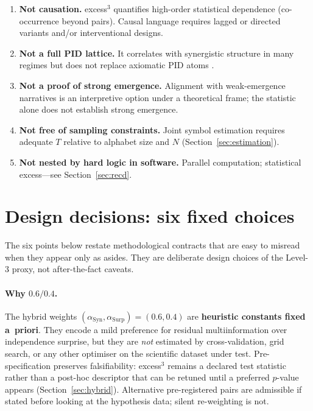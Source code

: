 \documentclass[11pt,a4paper]{article}
\begin{document}
\begin{enumerate}[leftmargin=*,itemsep=3pt]
  \item \textbf{Not causation.}
  excess$^3$ quantifies high-order statistical dependence
  (co-occurrence beyond pairs). Causal language requires lagged or directed
  variants and/or interventional designs.

  \item \textbf{Not a full PID lattice.}
  It correlates with synergistic structure in many regimes but does not
  replace axiomatic PID atoms \citep{Williams2010,Bertschinger2014}.

  \item \textbf{Not a proof of strong emergence.}
  Alignment with weak-emergence narratives is an interpretive option under
  a theoretical frame; the statistic alone does not establish strong
  emergence.

  \item \textbf{Not free of sampling constraints.}
  Joint symbol estimation requires adequate $T$ relative to alphabet size
  and $N$ (Section~\ref{sec:estimation}).

  \item \textbf{Not nested by hard logic in software.}
  Parallel computation; statistical excess---see Section~\ref{sec:recd}.
\end{enumerate}

\section{Design decisions: six fixed choices}
\label{sec:design}

The six points below restate methodological contracts that are easy to
misread when they appear only as asides. They are deliberate design choices
of the Level-3 proxy, not after-the-fact caveats.

\paragraph{Why $0.6/0.4$.}
The hybrid weights
$(\alpha_{\mathrm{Syn}},\alpha_{\mathrm{Surp}})=(0.6,0.4)$ are
\textbf{heuristic constants fixed a~priori}. They encode a mild preference
for residual multiinformation over independence surprise, but they are
\emph{not} estimated by cross-validation, grid search, or any other
optimiser on the scientific dataset under test. Pre-specification preserves
falsifiability: excess$^3$ remains a declared test statistic rather than a
post-hoc descriptor that can be retuned until a preferred $p$-value appears
(Section~\ref{sec:hybrid}). Alternative pre-registered pairs are admissible
if stated before looking at the hypothesis data; silent re-weighting is not.
\end{document}
